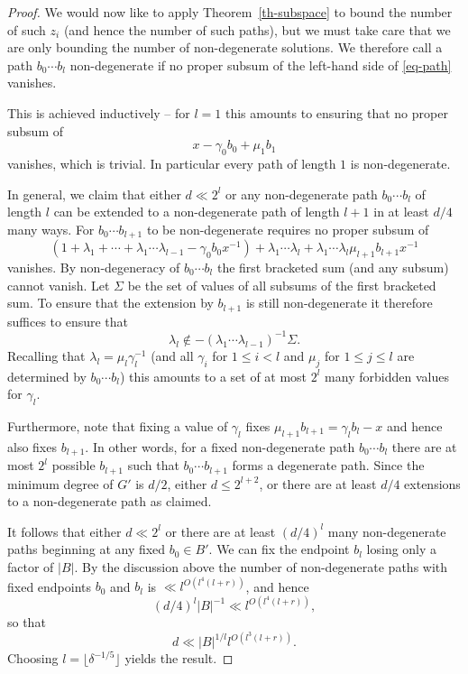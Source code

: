 \documentclass{amsart}
\renewcommand{\leq}{\leqslant}
\newcommand{\abs}[1]{\left\lvert #1\right\rvert}
\newcommand{\brac}[1]{\left( #1\right)}
\theoremstyle{definition}
\begin{document}
\begin{proof}
We would now like to apply Theorem~\ref{th-subspace} to bound the number of such $z_i$ (and hence the number of such paths), but we must take care that we are only bounding the number of non-degenerate solutions. We therefore call a path $b_0\cdots b_l$ non-degenerate if no proper subsum of the left-hand side of \eqref{eq-path} vanishes.

This is achieved inductively -- for $l=1$ this amounts to ensuring  that no proper subsum of 
\[x-\gamma_0b_0+\mu_1b_1\]
vanishes, which is trivial. In particular every path of length $1$ is non-degenerate.

In general, we claim that either $d\ll 2^l$ or any non-degenerate path $b_0\cdots b_l$ of length $l$ can be extended to a non-degenerate path of length $l+1$ in at least $d/4$ many ways. For $b_0\cdots b_{l+1}$ to be non-degenerate requires no proper subsum of
\[\brac{1+\lambda_1+\cdots+\lambda_1\cdots\lambda_{l-1}-\gamma_0b_0x^{-1}}+\lambda_1\cdots\lambda_l+\lambda_1\cdots\lambda_l\mu_{l+1}b_{l+1}x^{-1}\]
vanishes. By non-degeneracy of $b_0\cdots b_l$ the first bracketed sum (and any subsum) cannot vanish. Let $\Sigma$ be the set of values of all subsums of the first bracketed sum. To ensure that the extension by $b_{l+1}$ is still non-degenerate it therefore suffices to ensure that
\[\lambda_l\not\in -(\lambda_1\cdots \lambda_{l-1})^{-1}\Sigma.\]
Recalling that $\lambda_l=\mu_l\gamma_l^{-1}$ (and all $\gamma_i$ for $1\leq i<l$ and $\mu_j$ for $1\leq j\leq l$ are determined by $b_0\cdots b_l$) this amounts to a set of at most $2^{l}$ many forbidden values for $\gamma_l$.

Furthermore, note that fixing a value of $\gamma_l$ fixes $\mu_{l+1}b_{l+1}=\gamma_lb_l-x$ and hence also fixes $b_{l+1}$. In other words, for a fixed non-degenerate path $b_0\cdots b_l$ there are at most $2^l$ possible $b_{l+1}$ such that $b_0\cdots b_{l+1}$ forms a degenerate path. Since the minimum degree of $G'$ is $d/2$, either $d\leq 2^{l+2}$, or there are at least $d/4$ extensions to a non-degenerate path as claimed.


It follows that either $d\ll 2^l$ or there are at least $(d/4)^l$ many non-degenerate paths beginning at any fixed $b_0\in B'$. We can fix the endpoint $b_l$ losing only a factor of $\abs{B}$. By the discussion above the number of non-degenerate paths with fixed endpoints $b_0$ and $b_l$ is $\ll l^{O(l^4(l+r))}$, and hence
\[(d/4)^l\abs{B}^{-1}\ll l^{O(l^4(l+r))},\]
so that
\[d \ll \abs{B}^{1/l} l^{O(l^3(l+r))}.\]
Choosing $l=\lfloor \delta^{-1/5}\rfloor$ yields the result.
\end{proof}
\end{document}
